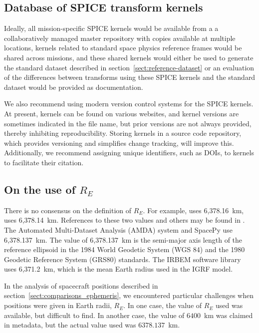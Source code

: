 \documentclass[draft]{agujournal2019}
\begin{document}
\subsection{Database of SPICE transform kernels}

Ideally, all mission-specific SPICE kernels would be available from a a collaboratively managed master repository with copies available at multiple locations, kernels related to standard space physics reference frames would be shared across missions, and these shared kernels would either be used to generate the standard dataset described in section~\ref{sect:reference-dataset} or an evaluation of the differences between transforms using these SPICE kernels and the standard dataset would be provided as documentation.

We also recommend using modern version control systems for the SPICE kernels. At present, kernels can be found on various websites, and kernel versions are sometimes indicated in the file name, but prior versions are not always provided, thereby inhibiting reproducibility. Storing kernels in a source code repository, which provides versioning and simplifies change tracking, will improve this. Additionally, we recommend assigning unique identifiers, such as DOIs, to kernels to facilitate their citation.


\subsection{On the use of $R_E$}
\label{sect:R_E}

There is no consensus on the definition of $R_E$. For example,  uses 6,378.16~km,  uses 6,378.14~km. References to these two values and others may be found in . The Automated Multi-Dataset Analysis (AMDA) system \cite{Genot2021} and SpacePy \cite{SpacePy} use 6,378.137~km. The value of 6,378.137~km is the semi-major axis length of the reference ellipsoid in the 1984 World Geodetic System (WGS 84) and the 1980 Geodetic Reference System (GRS80) standards. The IRBEM software library \cite{IRBEM2022} uses 6,371.2~km, which is the mean Earth radius used in the IGRF \cite{IAGA_V-MOD2026} model.

In the analysis of spacecraft positions described in section~\ref{sect:comparisons_ephemeris}, we encountered particular challenges when positions were given in Earth radii, $R_E$. In one case, the value of $R_E$ used was available, but difficult to find. In another case, the value of $6400$~km was claimed in metadata, but the actual value used was $6378.137$~km.
\end{document}
